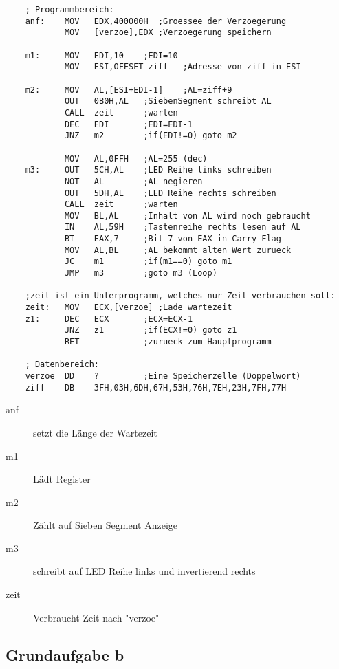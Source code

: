 \documentclass[a4paper,10pt,titlepage]{scrartcl}
\begin{document}
\begin{lstlisting}
    ; Programmbereich:
    anf:    MOV   EDX,400000H  ;Groessee der Verzoegerung
            MOV   [verzoe],EDX ;Verzoegerung speichern
    
    m1:     MOV   EDI,10    ;EDI=10
            MOV   ESI,OFFSET ziff   ;Adresse von ziff in ESI
    
    m2:     MOV   AL,[ESI+EDI-1]    ;AL=ziff+9
            OUT   0B0H,AL   ;SiebenSegment schreibt AL
            CALL  zeit      ;warten
            DEC   EDI       ;EDI=EDI-1
            JNZ   m2        ;if(EDI!=0) goto m2
    
            MOV   AL,0FFH   ;AL=255 (dec)
    m3:     OUT   5CH,AL    ;LED Reihe links schreiben
            NOT   AL        ;AL negieren
            OUT   5DH,AL    ;LED Reihe rechts schreiben
            CALL  zeit      ;warten
            MOV   BL,AL     ;Inhalt von AL wird noch gebraucht
            IN    AL,59H    ;Tastenreihe rechts lesen auf AL
            BT    EAX,7     ;Bit 7 von EAX in Carry Flag
            MOV   AL,BL     ;AL bekommt alten Wert zurueck
            JC    m1        ;if(m1==0) goto m1
            JMP   m3        ;goto m3 (Loop)
    
    ;zeit ist ein Unterprogramm, welches nur Zeit verbrauchen soll:
    zeit:   MOV   ECX,[verzoe] ;Lade wartezeit
    z1:     DEC   ECX       ;ECX=ECX-1
            JNZ   z1        ;if(ECX!=0) goto z1
            RET             ;zurueck zum Hauptprogramm
    
    ; Datenbereich:
    verzoe  DD    ?         ;Eine Speicherzelle (Doppelwort)
    ziff    DB    3FH,03H,6DH,67H,53H,76H,7EH,23H,7FH,77H
    \end{lstlisting}

\begin{description}
        \item[anf] setzt die Länge der Wartezeit
        \item[m1] Lädt Register
        \item[m2] Zählt auf Sieben Segment Anzeige
        \item[m3] schreibt auf LED Reihe links und invertierend rechts
        \item[zeit] Verbraucht Zeit nach "verzoe"
\end{description}

\subsection*{Grundaufgabe b}
\end{document}

